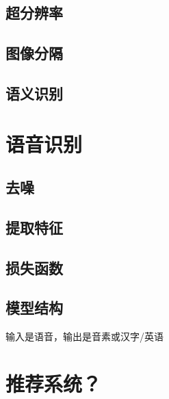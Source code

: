     \subsection{超分辨率}
    \subsection{图像分隔}
    \subsection{语义识别}
    \section{语音识别}
    \subsection{去噪}
    \subsection{提取特征}
    \subsection{损失函数}
    \subsection{模型结构}
    输入是语音，输出是音素或汉字/英语
    \section{推荐系统？}